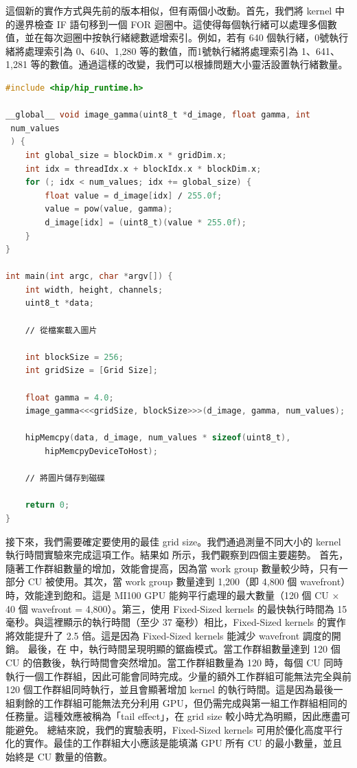 這個新的實作方式與先前的版本相似，但有兩個小改動。首先，我們將 kernel 中的邊界檢查 IF 語句移到一個 FOR 迴圈中。這使得每個執行緒可以處理多個數值，並在每次迴圈中按執行緒總數遞增索引。例如，若有 640 個執行緒，0號執行緒將處理索引為 0、640、1,280 等的數值，而1號執行緒將處理索引為 1、641、1,281 等的數值。通過這樣的改變，我們可以根據問題大小靈活設置執行緒數量。

\begin{lstlisting}[language=C, caption={使用Fixed-Sized kernels 的影像伽瑪校正 GPU 實作： kernel 以預定義的大小啟動，每個執行緒負責處理影像中的多個像素。}, captionpos=t, label={lst:FixedSize}]
#include <hip∕hip_runtime.h>

__global__ void image_gamma(uint8_t *d_image, float gamma, int 
 num_values
 ) {
    int global_size = blockDim.x * gridDim.x;
    int idx = threadIdx.x + blockIdx.x * blockDim.x;
    for (; idx < num_values; idx += global_size) {
        float value = d_image[idx] ∕ 255.0f;
        value = pow(value, gamma);
        d_image[idx] = (uint8_t)(value * 255.0f);
    }
}

int main(int argc, char *argv[]) {
    int width, height, channels;
    uint8_t *data;

    ∕∕ 從檔案載入圖片

    int blockSize = 256;
    int gridSize = [Grid Size];

    float gamma = 4.0;
    image_gamma<<<gridSize, blockSize>>>(d_image, gamma, num_values);

    hipMemcpy(data, d_image, num_values * sizeof(uint8_t),
        hipMemcpyDeviceToHost);

    ∕∕ 將圖片儲存到磁碟

    return 0;
}
\end{lstlisting}

接下來，我們需要確定要使用的最佳 grid size。我們通過測量不同大小的 kernel 執行時間實驗來完成這項工作。結果如  所示，我們觀察到四個主要趨勢。
首先，隨著工作群組數量的增加，效能會提高，因為當 work group 數量較少時，只有一部分 CU 被使用。其次，當 work group 數量達到 1,200（即 4,800 個 wavefront）時，效能達到飽和。這是 MI100 GPU 能夠平行處理的最大數量（120 個 CU × 40 個 wavefront = 4,800）。第三，使用 Fixed-Sized kernels 的最快執行時間為 15 毫秒。與這裡顯示的執行時間（至少 37 毫秒）相比，Fixed-Sized kernels 的實作將效能提升了 2.5 倍。這是因為 Fixed-Sized kernels 能減少 wavefront 調度的開銷。
最後，在  中，執行時間呈現明顯的鋸齒模式。當工作群組數量達到 120 個 CU 的倍數後，執行時間會突然增加。當工作群組數量為 120 時，每個 CU 同時執行一個工作群組，因此可能會同時完成。少量的額外工作群組可能無法完全與前 120 個工作群組同時執行，並且會顯著增加 kernel 的執行時間。這是因為最後一組剩餘的工作群組可能無法充分利用 GPU，但仍需完成與第一組工作群組相同的任務量。這種效應被稱為「tail effect」，在 grid size 較小時尤為明顯，因此應盡可能避免。
總結來說，我們的實驗表明，Fixed-Sized kernels 可用於優化高度平行化的實作。最佳的工作群組大小應該是能填滿 GPU 所有 CU 的最小數量，並且始終是 CU 數量的倍數。

